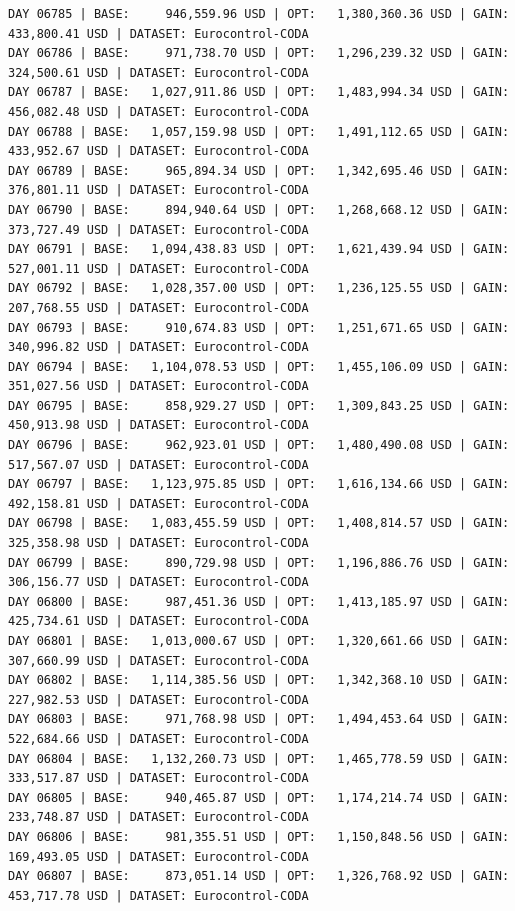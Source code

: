 \documentclass[11pt,a4paper]{article}
\begin{document}
\begin{verbatim}
DAY 06785 | BASE:     946,559.96 USD | OPT:   1,380,360.36 USD | GAIN: 433,800.41 USD | DATASET: Eurocontrol-CODA
DAY 06786 | BASE:     971,738.70 USD | OPT:   1,296,239.32 USD | GAIN: 324,500.61 USD | DATASET: Eurocontrol-CODA
DAY 06787 | BASE:   1,027,911.86 USD | OPT:   1,483,994.34 USD | GAIN: 456,082.48 USD | DATASET: Eurocontrol-CODA
DAY 06788 | BASE:   1,057,159.98 USD | OPT:   1,491,112.65 USD | GAIN: 433,952.67 USD | DATASET: Eurocontrol-CODA
DAY 06789 | BASE:     965,894.34 USD | OPT:   1,342,695.46 USD | GAIN: 376,801.11 USD | DATASET: Eurocontrol-CODA
DAY 06790 | BASE:     894,940.64 USD | OPT:   1,268,668.12 USD | GAIN: 373,727.49 USD | DATASET: Eurocontrol-CODA
DAY 06791 | BASE:   1,094,438.83 USD | OPT:   1,621,439.94 USD | GAIN: 527,001.11 USD | DATASET: Eurocontrol-CODA
DAY 06792 | BASE:   1,028,357.00 USD | OPT:   1,236,125.55 USD | GAIN: 207,768.55 USD | DATASET: Eurocontrol-CODA
DAY 06793 | BASE:     910,674.83 USD | OPT:   1,251,671.65 USD | GAIN: 340,996.82 USD | DATASET: Eurocontrol-CODA
DAY 06794 | BASE:   1,104,078.53 USD | OPT:   1,455,106.09 USD | GAIN: 351,027.56 USD | DATASET: Eurocontrol-CODA
DAY 06795 | BASE:     858,929.27 USD | OPT:   1,309,843.25 USD | GAIN: 450,913.98 USD | DATASET: Eurocontrol-CODA
DAY 06796 | BASE:     962,923.01 USD | OPT:   1,480,490.08 USD | GAIN: 517,567.07 USD | DATASET: Eurocontrol-CODA
DAY 06797 | BASE:   1,123,975.85 USD | OPT:   1,616,134.66 USD | GAIN: 492,158.81 USD | DATASET: Eurocontrol-CODA
DAY 06798 | BASE:   1,083,455.59 USD | OPT:   1,408,814.57 USD | GAIN: 325,358.98 USD | DATASET: Eurocontrol-CODA
DAY 06799 | BASE:     890,729.98 USD | OPT:   1,196,886.76 USD | GAIN: 306,156.77 USD | DATASET: Eurocontrol-CODA
DAY 06800 | BASE:     987,451.36 USD | OPT:   1,413,185.97 USD | GAIN: 425,734.61 USD | DATASET: Eurocontrol-CODA
DAY 06801 | BASE:   1,013,000.67 USD | OPT:   1,320,661.66 USD | GAIN: 307,660.99 USD | DATASET: Eurocontrol-CODA
DAY 06802 | BASE:   1,114,385.56 USD | OPT:   1,342,368.10 USD | GAIN: 227,982.53 USD | DATASET: Eurocontrol-CODA
DAY 06803 | BASE:     971,768.98 USD | OPT:   1,494,453.64 USD | GAIN: 522,684.66 USD | DATASET: Eurocontrol-CODA
DAY 06804 | BASE:   1,132,260.73 USD | OPT:   1,465,778.59 USD | GAIN: 333,517.87 USD | DATASET: Eurocontrol-CODA
DAY 06805 | BASE:     940,465.87 USD | OPT:   1,174,214.74 USD | GAIN: 233,748.87 USD | DATASET: Eurocontrol-CODA
DAY 06806 | BASE:     981,355.51 USD | OPT:   1,150,848.56 USD | GAIN: 169,493.05 USD | DATASET: Eurocontrol-CODA
DAY 06807 | BASE:     873,051.14 USD | OPT:   1,326,768.92 USD | GAIN: 453,717.78 USD | DATASET: Eurocontrol-CODA

\end{verbatim}
\end{document}
